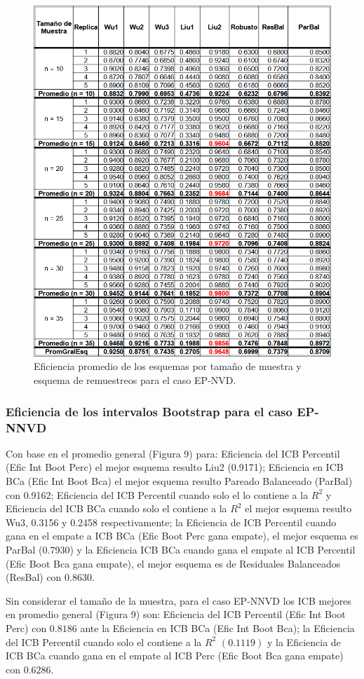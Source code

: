 \begin{figure}[ht] 
	\centering 
	\includegraphics[width=0.70\linewidth]{img/EP_NVD_Efic_Esq.png} 
	\caption{Eficiencia promedio de los esquemas por tamaño de muestra y esquema de remuestreos para el caso EP-NVD.} 
	\label{fig:EP_NVD_Esq}
\end{figure}
\FloatBarrier



\subsubsection{Eficiencia de los intervalos Bootstrap para el caso EP-NNVD}
Con base en el promedio general (Figura 9) para: Eficiencia del ICB Percentil (Efic Int Boot Perc) el mejor esquema resulto Liu2 (0.9171); 
Eficiencia en ICB BCa (Efic Int Boot Bca) el mejor esquema resulto Pareado Balanceado (ParBal) con 0.9162;
 Eficiencia del ICB Percentil cuando solo el lo contiene a la $R^{2}$ y Eficiencia del ICB BCa cuando solo el contiene a la $R^{2}$ el mejor esquema resulto Wu3, 0.3156 y 0.2458 respectivamente;
 la Eficiencia de ICB Percentil cuando gana en el empate a ICB BCa (Efic Boot Perc gana empate), el mejor esquema es ParBal (0.7930) y la Eficiencia ICB BCa cuando gana el empate al ICB Percentil (Efic Boot Bca gana empate), el mejor esquema es de Residuales Balanceados (ResBal) con 0.8630.
\vspace{.5cm}


Sin considerar el tamaño de la muestra, para el caso EP-NNVD los ICB mejores en promedio general (Figura 9) son: Eficiencia del ICB Percentil (Efic Int Boot Perc) con $0.8186$ ante la Eficiencia en ICB BCa (Efic Int Boot Bca); la Eficiencia del ICB Percentil cuando solo el contiene a la $R^{2}$ $(0.1119)$ y la Eficiencia de ICB BCa cuando gana en el empate al ICB Perc (Efic Boot Bca gana empate) con $0.6286$.


